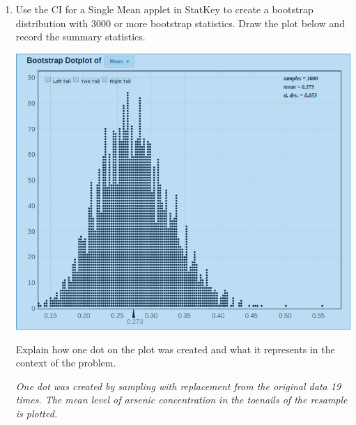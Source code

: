 \begin{enumerate}



\item 
 Use the {\sf CI for a Single Mean} applet in StatKey to create a
 bootstrap distribution with 3000 or more bootstrap statistics.  Draw the plot
 below and record the summary statistics.  %
\begin{students}
  \vspace{4cm}
\end{students}
\begin{key}
  {\it \includegraphics[width=.5\linewidth]{plots/arsenicCIplot.png}}
\end{key}

Explain how one dot on the plot was created and what it represents in
the context of the problem.
\begin{students}
  \vspace{1cm}
\end{students}
\begin{key}
  {\it One dot was created by sampling with replacement from the
    original data 19 times.  The mean level of arsenic concentration
    in the toenails of the resample is plotted.}
\end{key}


\end{enumerate}
